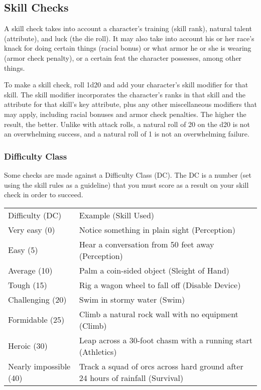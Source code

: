 \subsection{Skill Checks}
A skill check takes into account a character's training (skill rank), natural talent (attribute), and luck (the die roll). It may also take into account his or her race's knack for doing certain things (racial bonus) or what armor he or she is wearing (armor check penalty), or a certain feat the character possesses, among other things.

To make a skill check, roll 1d20 and add your character's skill modifier for that skill. The skill modifier incorporates the character's ranks in that skill and the attribute for that skill's key attribute, plus any other miscellaneous modifiers that may apply, including racial bonuses and armor check penalties. The higher the result, the better. Unlike with attack rolls, a natural roll of 20 on the d20 is not an overwhelming success, and a natural roll of 1 is not an overwhelming failure.

\subsubsection{Difficulty Class}
Some checks are made against a Difficulty Class (DC). The DC is a number (set using the skill rules as a guideline) that you must score as a result on your skill check in order to succeed.

\begin{dtable}
\begin{tabularx}{\columnwidth}{p{8em} X}
Difficulty (DC) & Example (Skill Used) \\
Very easy (0) & Notice something in plain sight (Perception) \\
Easy (5) & Hear a conversation from 50 feet away (Perception) \\
Average (10) & Palm a coin-sided object (Sleight of Hand) \\
Tough (15) & Rig a wagon wheel to fall off (Disable Device) \\
Challenging (20) & Swim in stormy water (Swim) \\
Formidable (25) & Climb a natural rock wall with no equipment (Climb) \\
Heroic (30) & Leap across a 30-foot chasm with a running start (Athletics) \\
Nearly impossible (40) & Track a squad of orcs across hard ground after 24 hours of rainfall (Survival) \\
\end{tabularx}
\end{dtable}

